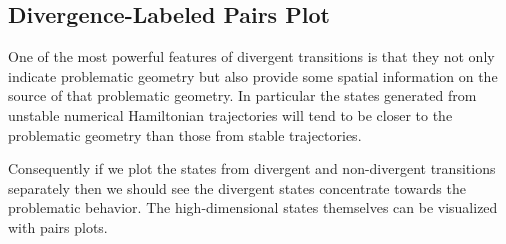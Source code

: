 \documentclass[
  letterpaper,
  DIV=11,
  numbers=noendperiod]{scrartcl}
\begin{document}
\subsection{Divergence-Labeled Pairs
Plot}\label{divergence-labeled-pairs-plot}

One of the most powerful features of divergent transitions is that they
not only indicate problematic geometry but also provide some spatial
information on the source of that problematic geometry. In particular
the states generated from unstable numerical Hamiltonian trajectories
will tend to be closer to the problematic geometry than those from
stable trajectories.

Consequently if we plot the states from divergent and non-divergent
transitions separately then we should see the divergent states
concentrate towards the problematic behavior. The high-dimensional
states themselves can be visualized with pairs plots.
\end{document}
